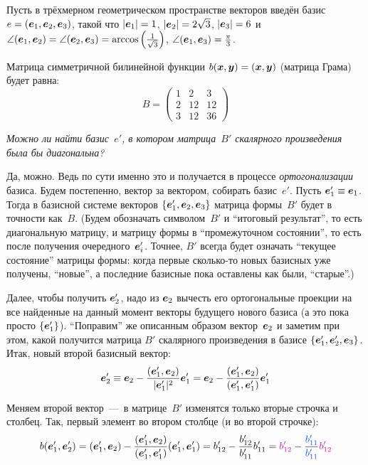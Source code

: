 \documentclass[a4paper,12pt]{article}
\begin{document}
  \begin{example}\label{ex:diag-scalar}
    Пусть в трёхмерном геометрическом пространстве векторов введён базис $e \hm= (\bds e_1, \bds e_2, \bds e_3)$, такой что $|\bds e_1| \hm= 1$, $|\bds e_2| \hm= 2 \sqrt{3}$, $|\bds e_3| \hm= 6$ и $\angle(\bds e_1, \bds e_2) \hm= \angle(\bds e_2, \bds e_3) \hm= \arccos\left(\frac{1}{\sqrt{3}}\right)$, $\angle(\bds e_1, \bds e_3) \hm= \frac{\pi}{3}$.
    
    Матрица симметричной билинейной функции $b(\bds x, \bds y) \hm= (\bds x, \bds y)$ (матрица Грама) будет равна:
    \[
      B = \begin{pmatrix}
        1 & 2  & 3\\
        2 & 12 & 12\\
        3 & 12 & 36
      \end{pmatrix}
    \]
    
    \emph{Можно ли найти базис~$e'$, в котором матрица~$B'$ скалярного произведения была бы диагональна?}
    
    Да, можно.
    Ведь по сути именно это и получается в процессе \emph{ортогонализации} базиса.
    Будем постепенно, вектор за вектором, собирать базис~$e'$.
    Пусть $\bds e_1' \hm\equiv \bds e_1$.
    Тогда в базисной системе векторов $\{\boldsymbol e_1', \boldsymbol e_2, \boldsymbol e_3\}$ матрица формы~$B'$ будет в точности как~$B$.
    (Будем обозначать символом~$B'$ и ``итоговый результат'', то есть диагональную матрицу, и матрицу формы в ``промежуточном состоянии'', то есть после получения очередного~$\boldsymbol e_i'$.
    Точнее, $B'$ всегда будет означать ``текущее состояние'' матрицы формы: когда первые сколько-то новых базисных уже получены, ``новые'', а последние базисные пока оставлены как были, ``старые''.)
    
    Далее, чтобы получить $\boldsymbol e_2'$, надо из $\boldsymbol e_2$ вычесть его ортогональные проекции на все найденные на данный момент векторы будущего нового базиса (а это пока просто $\{\boldsymbol e_1'\}$).
    ``Поправим'' же описанным образом вектор~$\boldsymbol e_2$ и заметим при этом, какой получится матрица $B'$ скалярного произведения в базисе $\{\boldsymbol e_1', \boldsymbol e_2', \boldsymbol e_3\}$.
    Итак, новый второй базисный вектор:
    \[
      \boldsymbol e_2' \equiv \boldsymbol e_2 - \frac{(\boldsymbol e_1', \boldsymbol e_2)}{|\boldsymbol e_1'|^2} \boldsymbol e_1'
                     = \boldsymbol e_2 - \frac{(\boldsymbol e_1', \boldsymbol e_2)}{(\boldsymbol e_1', \boldsymbol e_1')} \boldsymbol e_1'
    \]
    
    Меняем второй вектор~---~в матрице~$B'$ изменятся только вторые строчка и столбец.
    Так, первый элемент во втором столбце (и во второй строчке):
    \[
      b(\bds e_1', \bds e_2') = (\bds e_1', \bds e_2) - \frac{(\bds e_1', \bds e_2)}{(\bds e_1', \bds e_1')} (\bds e_1', \bds e_1')
        = b'_{12} - \frac{b'_{12}}{b'_{11}} b'_{11}
        = \textcolor{pink}{b'_{12}} - \frac{\textcolor{blue}{b'_{11}}}{\textcolor{blue}{b'_{11}}} \textcolor{pink}{b'_{12}}
    \]
        

\end{example}
\end{document}
